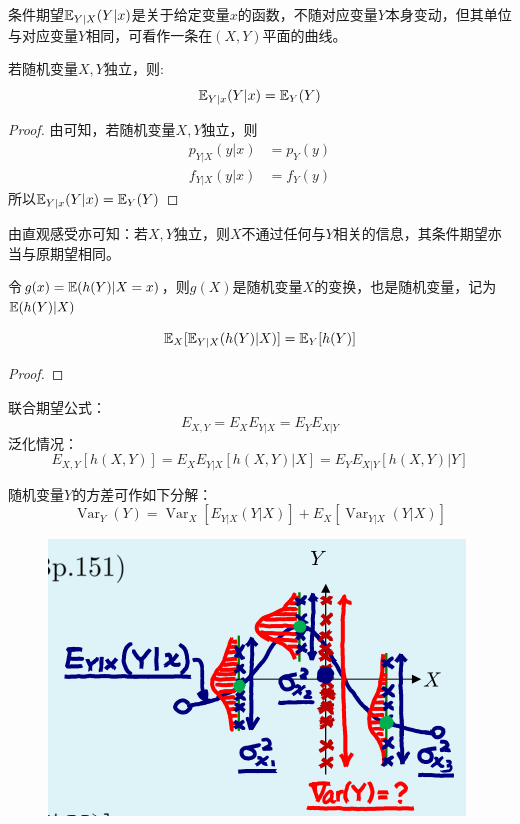 \begin{remark}
    条件期望$\mathbb{E}_{Y|X}(Y|x)$是关于给定变量$x$的函数，不随对应变量$Y$本身变动，但其单位与对应变量$Y$相同，可看作一条在$(X,Y)$平面的曲线。
\end{remark}

\begin{theorem}
    若随机变量$X,Y$独立，则:
    \[ \mathbb{E}_{Y|x}(Y|x)=\mathbb{E}_{Y}(Y) \]
\end{theorem}

\begin{proof}
    由\label{thm:indep_cmf}可知，若随机变量$X,Y$独立，则
    \begin{align*}
        p_{Y|X}(y|x)&=p_{Y}(y) \\
        f_{Y|X}(y|x)&=f_{Y}(y)
    \end{align*}
    所以$\mathbb{E}_{Y|x}(Y|x)=\mathbb{E}_{Y}(Y)$
\end{proof}

由直观感受亦可知：若$X,Y$独立，则$X$不通过任何与$Y$相关的信息，其条件期望亦当与原期望相同。

\begin{note}
    令$g(x)=\mathbb{E}(h(Y)|X=x)$，则$g(X)$是随机变量$X$的变换，也是随机变量，记为$\mathbb{E}(h(Y)|X)$
\end{note}

\begin{theorem}[重期望公式]
    \[ \mathbb{E}_X[\mathbb{E}_{Y|X}(h(Y)|X)] = \mathbb{E}_{Y}[h(Y)] \]
\end{theorem}

\begin{proof}
\end{proof}

\begin{theorem}
    联合期望公式：
    \[ E_{X,Y}=E_X E_{Y|X} = E_Y E_{X|Y} \]
    泛化情况：
    \[ E_{X,Y}[h(X,Y)]=E_X E_{Y|X}[h(X,Y)|X] = E_Y E_{X|Y}[h(X,Y)|Y] \]
\end{theorem}

\begin{theorem}[重方差公式]\label{thm:var_dec}
    随机变量$Y$的方差可作如下分解：
    \[ \operatorname{Var}_Y(Y)=\operatorname{Var}_X[E_{Y|X}(Y|X)] + E_X[\operatorname{Var}_{Y|X}(Y|X)] \]
\end{theorem}

\begin{figure}
    \centering
    \includegraphics{image/var_dec.png}
\end{figure}

